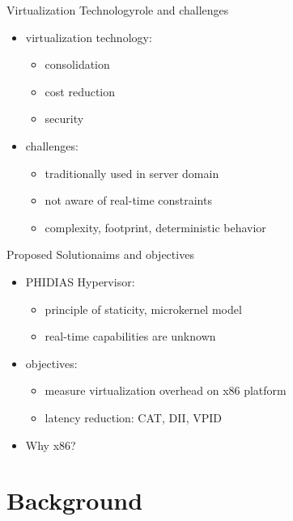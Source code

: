 \documentclass[10pt,hyperref={hyperfootnotes=false}, xcolor={usenames, dvipsnames}]{beamer}
\begin{document}
\begin{frame}{Virtualization Technology}{role and challenges}
  \begin{itemize}  
  \item {virtualization technology: \pause{} 
		  \begin{itemize}
      	   \item {consolidation} \pause{}
		   \item {cost reduction}  \pause{}
		   \item {security}  \pause{}
	      \end{itemize} 
		}	
  \item {challenges: 
          \begin{itemize}
      	   \item {traditionally used in server domain} \pause{}
		   \item {not aware of real-time constraints}  \pause{}
		   \item {complexity, footprint, deterministic behavior}
	      \end{itemize}
		}
  \end{itemize}
\end{frame}

\begin{frame}{Proposed Solution}{aims and objectives}
  \begin{itemize}
  \item {PHIDIAS Hypervisor:  \pause{}
		  \begin{itemize}
				\item{principle of staticity, microkernel model} \pause{}
				\item{real-time capabilities are unknown} \pause{}
		  \end{itemize}
		}
  \item {objectives: \pause{}
	        \begin{itemize}
        	   \item {measure virtualization overhead on x86 platform}  \pause{} 
			   \item {latency reduction: \pause{} CAT, \pause{} DII, \pause{} VPID}  \pause{}
	        \end{itemize}
		}
  \item {Why x86?}
  \end{itemize}
\end{frame}

\section{Background}
\end{document}
